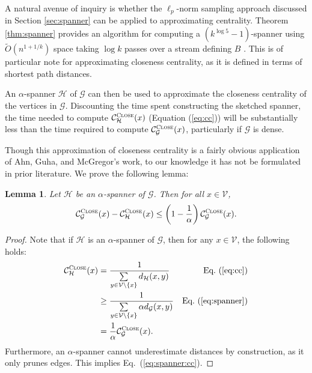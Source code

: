 \documentclass[10]{report}
\newtheorem{lemma}[theorem]{Lemma}
\newcommand{\algoname}[1]{\textnormal{\textsc{#1}}}
\begin{document}


A natural avenue of inquiry is whether the $\ell_p$-norm sampling approach discussed in Section \ref{sec:spanner} can be applied to approximating centrality. 
Theorem \ref{thm:spanner} provides an algorithm for computing a $(k^{\log 5} -1)$-spanner using $\widetilde{O}(n^{1+1/k})$ space taking $\log k$ passes over a stream defining $B$ \cite{ahn2012graph}. 
This is of particular note for approximating closeness centrality, as it is defined in terms of shortest path distances.

An $\alpha$-spanner $\mathcal{H}$ of $\mathcal{G}$ can then be used to approximate the closeness centrality of the vertices in $\mathcal{G}$.
Discounting the time spent constructing the sketched spanner, the time needed to compute $\mathcal{C}^{\algoname{Close}}_{\mathcal{H}}(x)$ (Equation (\ref{eq:cc})) will be substantially less than the time required to compute $\mathcal{C}^{\algoname{Close}}_{\mathcal{G}}(x)$, particularly if $\mathcal{G}$ is dense. 

Though this approximation of closeness centrality is a fairly obvious application of Ahn, Guha, and McGregor's work, to our knowledge it has not be formulated in prior literature. 
We prove the following lemma:

\begin{lemma} \label{lem:spanner:cc}
Let $\mathcal{H}$ be an $\alpha$-spanner of $\mathcal{G}$. 
Then for all $x \in \mathcal{V}$, 
%
\begin{equation} \label{eq:spanner:cc}
\mathcal{C}^{\algoname{Close}}_{\mathcal{G}}(x) - \mathcal{C}^{\algoname{Close}}_{\mathcal{H}}(x) \leq \left ( 1 - \frac{1}{\alpha} \right ) \mathcal{C}^{\algoname{Close}}_{\mathcal{G}}(x).
\end{equation}
%
\end{lemma}
%
\begin{proof}
Note that if $\mathcal{H}$ is an $\alpha$-spanner of $\mathcal{G}$, then for any $x \in \mathcal{V}$, the following holds:
%
\begin{align*}
\mathcal{C}^{\algoname{Close}}_\mathcal{H}(x) 
&= \frac{1}{\sum\limits_{y \in \mathcal{V} \setminus \{x\}} d_\mathcal{H}(x,y)}
&\textnormal{Eq.~(\ref{eq:cc}})\\
&\geq \frac{1}{\sum\limits_{y \in \mathcal{V} \setminus \{x\}} \alpha d_\mathcal{G}(x,y)}
&\textnormal{Eq.~(\ref{eq:spanner}})\\
&= \frac{1}{\alpha}\mathcal{C}^{\algoname{Close}}_\mathcal{G}(x).
\end{align*}
Furthermore, an $\alpha$-spanner cannot underestimate distances by construction, as it only prunes edges.
This implies Eq.~(\ref{eq:spanner:cc}).
\end{proof}
%
\end{document}
